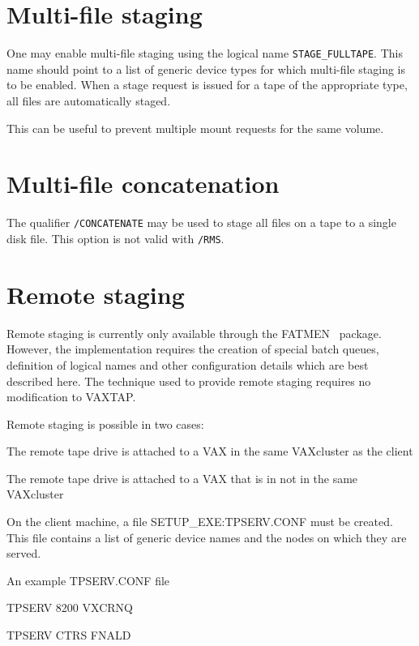 \section{Multi-file staging}

One may enable multi-file staging using the logical name
{\tt STAGE\_FULLTAPE}. This name should point to a list of
generic device types for which multi-file staging is to be
enabled. When a stage request is issued for a tape of the
appropriate type, all files are automatically staged.

This can be useful to prevent multiple mount requests for the
same volume.

\section{Multi-file concatenation}

The qualifier {\tt /CONCATENATE} may be used to stage
all files on a tape to a single disk file. This option
is not valid with {\tt /RMS}.
\section{Remote staging}

Remote staging is currently only available through the
FATMEN~\cite{bib-FATMEN}
package. However, the implementation requires the creation of
special batch queues, definition of logical names and other
configuration details which are best described here. The technique
used to provide remote staging requires no modification to VAXTAP.

Remote staging is possible in two cases:
\begin{OL}
\item
The remote tape drive is attached to a VAX in the same VAXcluster
as the client
\item
The remote tape drive is attached to a VAX that is in not in
the same VAXcluster
\end{OL}

On the client machine, a file SETUP\_EXE:TPSERV.CONF must be
created. This file contains a list of generic device names
and the nodes on which they are served.

\begin{XMPt}{An example TPSERV.CONF file}

TPSERV 8200 VXCRNQ

TPSERV CTRS FNALD

\end{XMPt}

